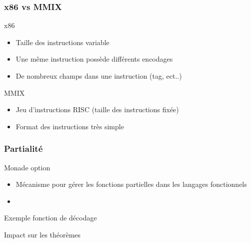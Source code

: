 \documentclass{beamer}
\newcommand{\codefrom}[3]
           {}
\begin{document}
\begin{frame}
\frametitle{x86 vs MMIX}

\begin{block}{x86}
  \begin{itemize}
    \item Taille des instructions variable
    \item Une même instruction possède différents encodages
    \item De nombreux champs dans une instruction (tag, ect..)
    \end{itemize}  
\end{block}

\begin{block}{MMIX}
  \begin{itemize}
  \item Jeu d'instructions RISC (taille des instructions fixée)
  \item Format des instructions très simple
  \end{itemize}  
\end{block}

\vfill

\end{frame}
\begin{frame}
\frametitle{Partialité} 

\begin{block}{Monade option}
  \begin{itemize}
  \item Mécanisme pour gérer les fonctions partielles dans les langages fonctionnels
  \item \fontsize{8}{10} \codefrom{rapport}{definitions}{option}
  \end{itemize}  
\end{block}
\begin{block}{Exemple fonction de décodage}
  \fontsize{8}{10} \codefrom{src}{encode}{decode}
\end{block}

\begin{block}{Impact sur les théorèmes}
  \fontsize{8}{10} \codefrom{src}{decodeProof}{decode_encode}
\end{block}
  




\end{frame}
\end{document}
